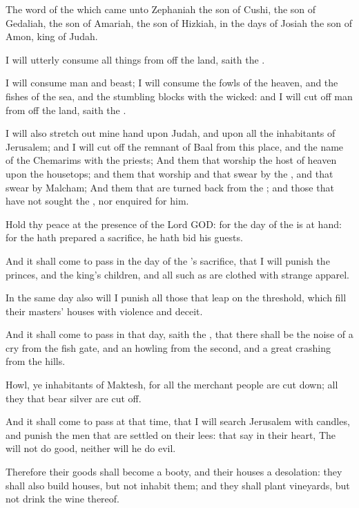 


\Chapter
\Verse The word of the \LORD which came unto Zephaniah the son of Cushi, the son of Gedaliah, the son of Amariah, the son of Hizkiah, in the days of Josiah the son of Amon, king of Judah.

\Verse I will utterly consume all things from off the land, saith the \LORD.

\Verse I will consume man and beast; I will consume the fowls of the heaven, and the fishes of the sea, and the stumbling blocks with the wicked: and I will cut off man from off the land, saith the \LORD.

\Verse I will also stretch out mine hand upon Judah, and upon all the inhabitants of Jerusalem; and I will cut off the remnant of Baal from this place, and the name of the Chemarims with the priests; \Verse And them that worship the host of heaven upon the housetops; and them that worship and that swear by the \LORD, and that swear by Malcham; \Verse And them that are turned back from the \LORD; and those that have not sought the \LORD, nor enquired for him.

\Verse Hold thy peace at the presence of the Lord GOD: for the day of the \LORD is at hand: for the \LORD hath prepared a sacrifice, he hath bid his guests.

\Verse And it shall come to pass in the day of the \LORD's sacrifice, that I will punish the princes, and the king's children, and all such as are clothed with strange apparel.

\Verse In the same day also will I punish all those that leap on the threshold, which fill their masters' houses with violence and deceit.

\Verse And it shall come to pass in that day, saith the \LORD, that there shall be the noise of a cry from the fish gate, and an howling from the second, and a great crashing from the hills.

\Verse Howl, ye inhabitants of Maktesh, for all the merchant people are cut down; all they that bear silver are cut off.

\Verse And it shall come to pass at that time, that I will search Jerusalem with candles, and punish the men that are settled on their lees: that say in their heart, The \LORD will not do good, neither will he do evil.

\Verse Therefore their goods shall become a booty, and their houses a desolation: they shall also build houses, but not inhabit them; and they shall plant vineyards, but not drink the wine thereof.

